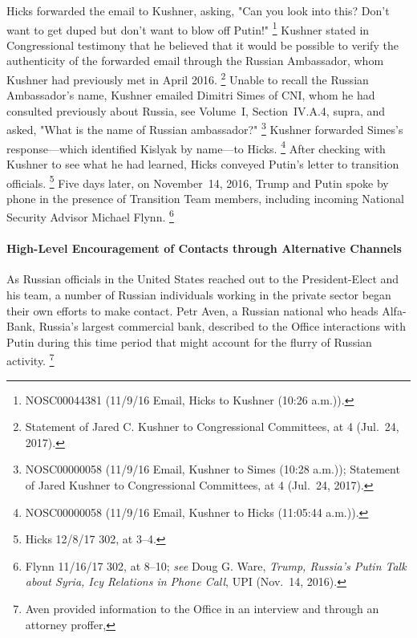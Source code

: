 Hicks forwarded the email to Kushner, asking, "Can you look into this?
Don't want to get duped but don't want to blow off Putin!"%
\footnote{NOSC00044381 (11/9/16 Email, Hicks to Kushner (10:26 a.m.)).}
Kushner stated in Congressional testimony that he believed that it would be possible to verify the authenticity of the forwarded email through the Russian Ambassador, whom Kushner had previously met in April 2016.%
\footnote{Statement of Jared C. Kushner to Congressional Committees, at 4 (Jul.~24, 2017).}
Unable to recall the Russian Ambassador's name, Kushner emailed Dimitri Simes of CNI, whom he had consulted previously about Russia, see Volume~I, Section~IV.A.4, supra, and asked, "What is the name of Russian ambassador?"%
\footnote{NOSC00000058 (11/9/16 Email, Kushner to Simes (10:28 a.m.));
Statement of Jared Kushner to Congressional Committees, at 4 (Jul.~24, 2017).}
Kushner forwarded Simes's response---which identified Kislyak by name---to Hicks.%
\footnote{NOSC00000058 (11/9/16 Email, Kushner to Hicks (11:05:44 a.m.)).}
After checking with Kushner to see what he had learned, Hicks conveyed Putin's letter to transition officials.%
\footnote{Hicks 12/8/17 302, at 3--4.}
Five days later, on November~14, 2016, Trump and Putin spoke by phone in the presence of Transition Team members, including incoming National Security Advisor Michael Flynn.%
\footnote{Flynn 11/16/17 302, at 8--10;
\textit{see} Doug G. Ware, \textit{Trump, Russia's Putin Talk about Syria, Icy Relations in Phone Call}, UPI (Nov.~14, 2016).}

\paragraph{High-Level Encouragement of Contacts through Alternative Channels}

As Russian officials in the United States reached out to the President-Elect and his team, a number of Russian individuals working in the private sector began their own efforts to make contact.
Petr Aven, a Russian national who heads Alfa-Bank, Russia's largest commercial bank, described to the Office interactions with Putin during this time period that might account for the flurry of Russian activity.%
\footnote{Aven provided information to the Office in an interview and through an attorney proffer, }

